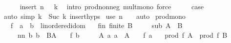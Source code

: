 \begin{isabellebody}
\ \ \ \ \isamarkupfalse%
\ insert\ {\isacartoucheopen}n\ {\isasymge}\ {}{\isacartoucheclose}\ k{\isacharprime}{\kern0pt}\ \isamarkupfalse%
\ {\isacharparenleft}{\kern0pt}intro\ prod{\isacharunderscore}{\kern0pt}nonneg\ mult{\isacharunderscore}{\kern0pt}mono{\isacharsemicolon}{\kern0pt}\ force{\isacharparenright}{\kern0pt}\isanewline
\ \ \isamarkupfalse%
\ \isamarkupfalse%
\ {\isacharquery}{\kern0pt}case\ \isanewline
\ \ \ \ \isamarkupfalse%
\ {\isacharparenleft}{\kern0pt}auto\ simp{\isacharcolon}{\kern0pt}\ {\isacartoucheopen}k\ {\isacharequal}{\kern0pt}\ Suc\ k{\isacharprime}{\kern0pt}{\isacartoucheclose}\ insert{\isachardot}{\kern0pt}hyps{\isacharparenright}{\kern0pt}\isanewline
{}\isamarkupfalse%
\ {\isacharparenleft}{\kern0pt}use\ {\isacartoucheopen}n\ {\isasymge}\ {}{\isacartoucheclose}\ \ auto{\isacharparenright}{\kern0pt}%
\endisatagproof
{\isafoldproof}%
%
\isadelimproof
\isanewline
%
\endisadelimproof
\isanewline
{}\isamarkupfalse%
\isanewline
\isanewline
{}\isamarkupfalse%
\ prod{\isacharunderscore}{\kern0pt}mono{}{\isacharcolon}{\kern0pt}\isanewline
\ \ \ f\ {\isacharcolon}{\kern0pt}{\isacharcolon}{\kern0pt}\ {\isachardoublequoteopen}{\isacharprime}{\kern0pt}a\ {\isasymRightarrow}\ {\isacharprime}{\kern0pt}b\ {\isacharcolon}{\kern0pt}{\isacharcolon}{\kern0pt}\ linordered{\isacharunderscore}{\kern0pt}idom{\isachardoublequoteclose}\isanewline
\ \ \ fin{\isacharcolon}{\kern0pt}\ {\isachardoublequoteopen}finite\ B{\isachardoublequoteclose}\isanewline
\ \ \ \ \ sub{\isacharcolon}{\kern0pt}\ {\isachardoublequoteopen}A\ {\isasymsubseteq}\ B{\isachardoublequoteclose}\isanewline
\ \ \ \ \ nn{\isacharcolon}{\kern0pt}\ {\isachardoublequoteopen}{\isasymAnd}b{\isachardot}{\kern0pt}\ b\ {\isasymin}\ B{\isacharminus}{\kern0pt}A\ {\isasymLongrightarrow}\ {}\ {\isasymle}\ f\ b{\isachardoublequoteclose}\isanewline
\ \ \ \ \ A{\isacharcolon}{\kern0pt}\ {\isachardoublequoteopen}{\isasymAnd}a{\isachardot}{\kern0pt}\ a\ {\isasymin}\ A\ {\isasymLongrightarrow}\ {}\ {\isasymle}\ f\ a{\isachardoublequoteclose}\isanewline
\ \ \ {\isachardoublequoteopen}prod\ f\ A\ {\isasymle}\ prod\ f\ B{\isachardoublequoteclose}\isanewline
%
\isadelimproof
%
\endisadelimproof
%
\isatagproof
{}\isamarkupfalse%
\ {\isacharminus}{\kern0pt}\isanewline
\ \ \isamarkupfalse%

\end{isabellebody}
